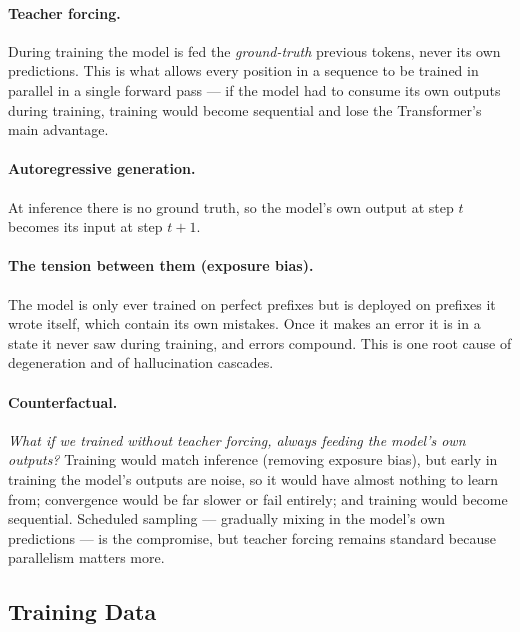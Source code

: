 \documentclass[11pt,a4paper]{article}
\begin{document}
\paragraph{Teacher forcing.} During training the model is fed the \emph{ground-truth}
previous tokens, never its own predictions. This is what allows every position in a sequence
to be trained in parallel in a single forward pass --- if the model had to consume its own
outputs during training, training would become sequential and lose the Transformer's main
advantage.

\paragraph{Autoregressive generation.} At inference there is no ground truth, so the model's
own output at step $t$ becomes its input at step $t+1$.

\paragraph{The tension between them (exposure bias).} The model is only ever trained on
perfect prefixes but is deployed on prefixes it wrote itself, which contain its own mistakes.
Once it makes an error it is in a state it never saw during training, and errors compound.
This is one root cause of degeneration and of hallucination cascades.

\paragraph{Counterfactual.} \emph{What if we trained without teacher forcing, always feeding
the model's own outputs?} Training would match inference (removing exposure bias), but early
in training the model's outputs are noise, so it would have almost nothing to learn from;
convergence would be far slower or fail entirely; and training would become sequential.
Scheduled sampling --- gradually mixing in the model's own predictions --- is the compromise,
but teacher forcing remains standard because parallelism matters more.

\subsection{Training Data}
\end{document}
